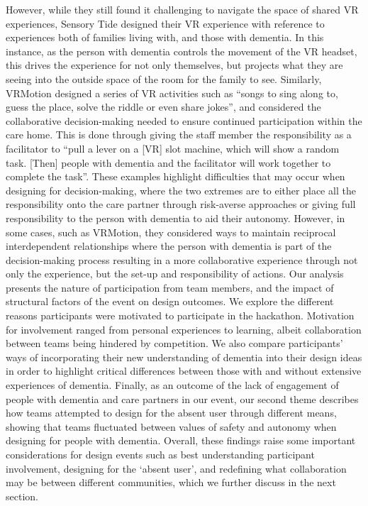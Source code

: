 However, while they still found it challenging to navigate the space of shared VR experiences, Sensory Tide designed their VR experience with reference to experiences both of families living with, and those with dementia. In this instance, as the person with dementia controls the movement of the VR headset, this drives the experience for not only themselves, but projects what they are seeing into the outside space of the room for the family to see.  Similarly, VRMotion designed a series of VR activities such as “songs to sing along to, guess the place, solve the riddle or even share jokes”, and considered the collaborative decision-making needed to ensure continued participation within the care home. This is done through giving the staff member the responsibility as a facilitator to “pull a lever on a [VR] slot machine, which will show a random task. [Then] people with dementia and the facilitator will work together to complete the task”. These examples highlight difficulties that may occur when designing for decision-making, where the two extremes are to either place all the responsibility onto the care partner through risk-averse approaches or giving full responsibility to the person with dementia to aid their autonomy. However, in some cases, such as VRMotion, they considered ways to maintain reciprocal interdependent relationships where the person with dementia is part of the decision-making process resulting in a more collaborative experience through not only the experience, but the set-up and responsibility of actions. Our analysis presents the nature of participation from team members, and the impact of structural factors of the event on design outcomes. We explore the different reasons participants were motivated to participate in the hackathon. Motivation for involvement ranged from personal experiences to learning, albeit collaboration between teams being hindered by competition. We also compare participants’ ways of incorporating their new understanding of dementia into their design ideas in order to highlight critical differences between those with and without extensive experiences of dementia. Finally, as an outcome of the lack of engagement of people with dementia and care partners in our event, our second theme describes how teams attempted to design for the absent user through different means, showing that teams fluctuated between values of safety and autonomy when designing for people with dementia. Overall, these findings raise some important considerations for design events such as best understanding participant involvement, designing for the ‘absent user’, and redefining what collaboration may be between different communities, which we further discuss in the next section. 
